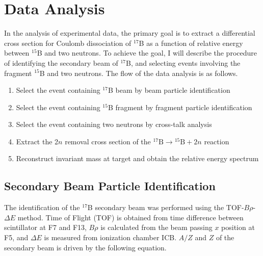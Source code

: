 \chapter{Data Analysis}
In the analysis of experimental data, the primary goal is to extract a differential cross section for Coulomb dissociation of $^{17}$B as a function of relative energy between $^{15}$B and two neutrons. To achieve the goal, I will describe the procedure of identifying the secondary beam of ${}^{17}$B, and selecting events involving the fragment ${}^{15}$B and two neutrons. The flow of the data analysis is as follows.

\begin{center}
    \begin{enumerate}
        \item Select the event containing ${}^{17}$B beam by beam particle identification
        \item Select the event containing ${}^{15}$B fragment by fragment particle identification
        \item Select the event containing two neutrons by cross-talk analysis
        \item Extract the 2$n$ removal cross section of the ${}^{17}\text{B} \to {}^{15}\text{B} + 2n$ reaction
        \item Reconstruct invariant mass at target and obtain the relative energy spectrum 
    \end{enumerate}
\end{center}

\section{Secondary Beam Particle Identification}

The identification of the ${}^{17}$B secondary beam was performed using the TOF-$B\rho$-$\Delta E$ method. Time of Flight (TOF) is obtained from time difference between scintillator at F7 and F13, $B\rho$ is calculated from the beam passing $x$ position at F5, and $\Delta E$ is measured from ionization chamber ICB. $A/Z$ and $Z$ of the secondary beam is driven by the following equation.

